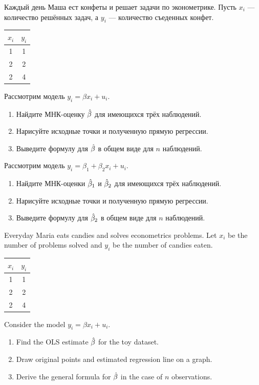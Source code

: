 \begin{problem}
\begin{translationru}
Каждый день Маша ест конфеты и решает задачи по эконометрике. Пусть $x_i$ — количество решённых задач, а $y_i$ — количество съеденных конфет.

\begin{tabular}{cc}
\toprule
$x_i$ & $y_i$ \\
\midrule
1 & 1 \\
2 & 2 \\
2 & 4 \\
\bottomrule
\end{tabular}

Рассмотрим модель $y_i = \beta x_i + u_i$.

\begin{enumerate}
\item Найдите МНК-оценку $\hat{\beta}$ для имеющихся трёх наблюдений.
\item Нарисуйте исходные точки и полученную прямую регрессии.
\item Выведите формулу для $\hat{\beta}$ в общем виде для $n$ наблюдений.
\end{enumerate}

Рассмотрим модель $y_i = \beta_1 + \beta_2 x_i + u_i$.
\begin{enumerate}[resume]
\item Найдите МНК-оценки $\hat{\beta}_1$ и $\hat{\beta}_2$ для имеющихся трёх наблюдений.
\item Нарисуйте исходные точки и полученную прямую регрессии.
\item Выведите формулу для $\hat{\beta}_2$ в общем виде для $n$ наблюдений.
\end{enumerate}
\end{translationru}

\begin{translationen}
Everyday Maria eats candies and solves econometrics problems.
Let $x_i$ be the number of problems solved and $y_i$ be the number of candies eaten.

\begin{tabular}{cc}
\toprule
$x_i$ & $y_i$ \\
\midrule
1 & 1 \\
2 & 2 \\
2 & 4 \\
\bottomrule
\end{tabular}

Consider the model $y_i = \beta x_i + u_i$.

\begin{enumerate}
\item Find the OLS estimate $\hat{\beta}$ for the toy dataset.
\item Draw original points and estimated regression line on a graph.
\item Derive the general formula for $\hat{\beta}$ in the case of $n$ observations.
\end{enumerate}


\end{translationen}
\end{problem}

